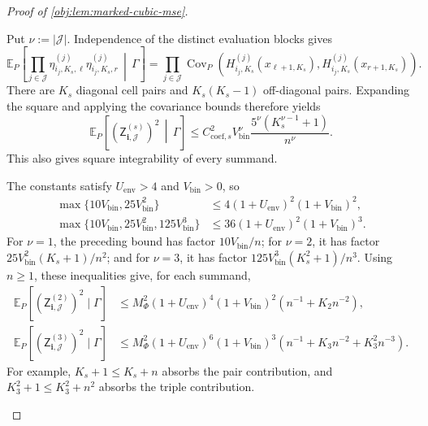 \documentclass[11pt]{article}
\begin{document}
\begin{proof}[Proof of \cref{obj:lem:marked-cubic-mse}]
\begin{enumerate}
Put \(\nu:=|\mathcal J|\). Independence of the distinct evaluation blocks gives
\[
\mathbb E_P\!\left[
\prod_{j\in\mathcal J}
\eta^{(j)}_{i_j,K_s,\ell}\eta^{(j)}_{i_j,K_s,r}
\,\middle|\,\Gamma
\right]
=
\prod_{j\in\mathcal J}
\operatorname{Cov}_P\!\left(
H_{i_j,K_s}^{(j)}(x_{\ell+1,K_s}),
H_{i_j,K_s}^{(j)}(x_{r+1,K_s})
\right).
\]
There are \(K_s\) diagonal cell pairs and \(K_s(K_s-1)\) off-diagonal pairs. Expanding the square and applying the covariance bounds therefore yields
\[
\mathbb E_P\!\left[
(\mathsf Z^{(s)}_{\boldsymbol i,\mathcal J})^2
\,\middle|\,\Gamma
\right]
\le
C_{\mathrm{coef},s}^2V_{\mathrm{bin}}^\nu
\frac{5^\nu(K_s^{\nu-1}+1)}{n^\nu}.
\]
This also gives square integrability of every summand.

The constants satisfy \(U_{\mathrm{env}}>4\) and \(V_{\mathrm{bin}}>0\), so
\[
\begin{aligned}
\max\{10V_{\mathrm{bin}},25V_{\mathrm{bin}}^2\}
&\le4(1+U_{\mathrm{env}})^2(1+V_{\mathrm{bin}})^2,\\
\max\{10V_{\mathrm{bin}},25V_{\mathrm{bin}}^2,
125V_{\mathrm{bin}}^3\}
&\le36(1+U_{\mathrm{env}})^2(1+V_{\mathrm{bin}})^3.
\end{aligned}
\]
For \(\nu=1\), the preceding bound has factor \(10V_{\mathrm{bin}}/n\); for \(\nu=2\), it has factor \(25V_{\mathrm{bin}}^2(K_s+1)/n^2\); and for \(\nu=3\), it has factor \(125V_{\mathrm{bin}}^3(K_s^2+1)/n^3\).
Using \(n\ge1\), these inequalities give, for each summand,
\[
\begin{aligned}
\mathbb E_P[(\mathsf Z^{(2)}_{\boldsymbol i,\mathcal J})^2\mid\Gamma]
&\le
M_\Phi^2(1+U_{\mathrm{env}})^4(1+V_{\mathrm{bin}})^2
(n^{-1}+K_2n^{-2}),\\
\mathbb E_P[(\mathsf Z^{(3)}_{\boldsymbol i,\mathcal J})^2\mid\Gamma]
&\le
M_\Phi^2(1+U_{\mathrm{env}})^6(1+V_{\mathrm{bin}})^3
(n^{-1}+K_3n^{-2}+K_3^2n^{-3}).
\end{aligned}
\]
For example, \(K_s+1\le K_s+n\) absorbs the pair contribution, and \(K_3^2+1\le K_3^2+n^2\) absorbs the triple contribution.


\end{enumerate}
\end{proof}
\end{document}
